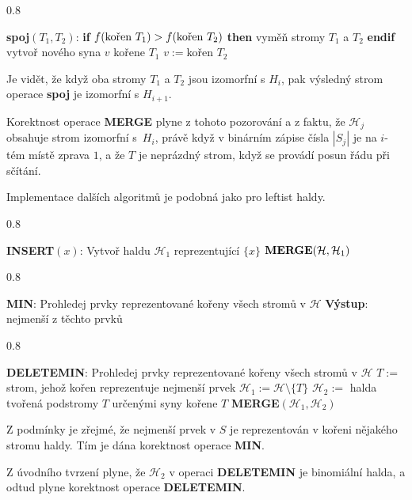 \documentclass[a4paper,12pt]{article}
\newcommand{\algoritmus}[1]{
  {
  \setlength\fboxrule{0.5pt}

  \begin{boxedminipage}{0.8\textwidth}

 #1
  \end{boxedminipage}

  }
  }
\begin{document}
\algoritmus{{\bf spoj$(T_1,T_2)$}:\newline 
{\bf \textsf{if}} $f(\text{\rm kořen }T_1)>f(\text{\rm kořen }T_2)$ {\bf \textsf{then}\newline 
\phantom{{\rm ---}}}vyměň stromy $T_1$ a $T_2$\newline 
{\bf \textsf{endif}\newline }
vytvoř nového  syna $v$ kořene $T_1$\newline 
$v:=$kořen $T_2$}

Je vidět, že když oba stromy $T_1$ a $T_2$ jsou izomorfní 
s $H_i$, pak výsledný strom operace {\bf spoj} je izomorfní 
s $H_{i+1}$. 

Korektnost ope\-race {\bf MERGE} plyne z tohoto 
pozorování a z faktu, že $\mathcal H_j$ obsahuje strom izomorfní s~$H_i$, právě když v binárním zápise čísla $
|S_j|$ je na $i$-tém 
místě zprava $1$, a že $T$ je neprázdný strom, když se 
provádí posun řádu při sčítání. 

Implementace dalších algoritmů 
je podobná jako pro leftist haldy. 

\algoritmus{
{\bf INSERT$(x)$}:\newline 
Vytvoř haldu $\mathcal H_1$ reprezentující $\{x\}$\newline 
$\bold M\bold E\bold R\bold G\bold E(\mathcal H,\mathcal H_1)$

}\algoritmus{
{\bf MIN}:\newline 
Prohledej prvky reprezentované kořeny všech stromů 
v $\mathcal H$\newline 
{\bf Výstup}: nejmenší z těchto prvků  
}

\algoritmus{
{\bf DELETEMIN}:\newline 
Prohledej prvky reprezentované kořeny všech stromů 
v $\mathcal H$\newline 
$T:=$ strom, jehož kořen reprezentuje nejmenší prvek\newline 
$\mathcal H_1:=\mathcal H\setminus \{T\}$\newline 
$\mathcal H_2:=$ halda tvořená podstromy $T$ určenými syny kořene $
T$\newline 
{\bf MERGE$(\mathcal H_1,\mathcal H_2)$
}
}

Z podmínky  je zřejmé, že 
nejmenší prvek v $S$ je reprezentován v kořeni nějakého  
stromu haldy. Tím je dána korekt\-nost operace {\bf MIN}.

Z úvodního tvrzení plyne, že $\mathcal H_2$ v operaci {\bf DELE\-TE\-MIN} je 
binomiální halda, a odtud plyne korekt\-nost ope\-race 
{\bf DE\-LE\-TEMIN}. 
\end{document}
